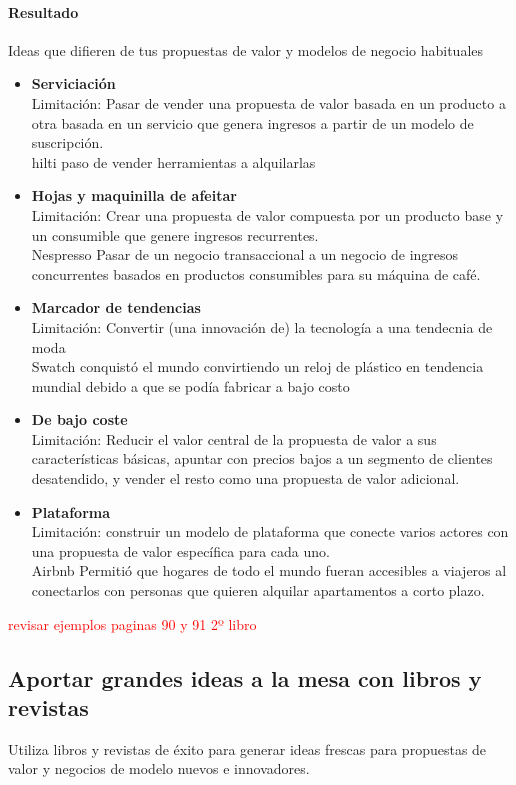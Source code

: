 \documentclass[11pt]{book}
\begin{document}
\paragraph{Resultado}
Ideas que difieren de tus propuestas de valor y modelos de negocio habituales
\begin{itemize}
\item \textbf{ Serviciación }\\
Limitación: Pasar de vender una propuesta de valor basada en un producto a otra basada en un servicio que genera ingresos a partir de un modelo de suscripción.\\
hilti paso de vender herramientas a alquilarlas
\item \textbf{ Hojas y maquinilla de afeitar }\\
Limitación: Crear una propuesta de valor compuesta por un producto base y un consumible que genere ingresos recurrentes.\\
Nespresso Pasar de un negocio transaccional a un negocio de ingresos concurrentes basados en productos consumibles para su máquina de café.

\item \textbf{ Marcador de tendencias }\\
Limitación: Convertir (una innovación de) la tecnología a una tendecnia de moda\\
Swatch conquistó el mundo convirtiendo un reloj de plástico en tendencia mundial debido a que se podía fabricar a bajo costo
\item \textbf{ De bajo coste }\\
Limitación: Reducir el valor central de la propuesta de valor a sus características básicas, apuntar con precios bajos a un segmento de clientes desatendido, y vender el resto como una propuesta de valor adicional.
\item \textbf{ Plataforma }\\
Limitación: construir un modelo de plataforma que conecte varios actores con una propuesta de valor específica para cada uno.\\
Airbnb Permitió que hogares de todo el mundo fueran accesibles a viajeros al conectarlos con personas que quieren alquilar apartamentos a corto plazo.  
\end{itemize}
\textcolor{red}{revisar ejemplos paginas 90 y 91 2º libro}
\subsection{Aportar grandes ideas a la mesa con libros y revistas}
Utiliza libros y revistas de éxito para generar ideas frescas para propuestas de valor y negocios de modelo nuevos e innovadores.
\end{document}
